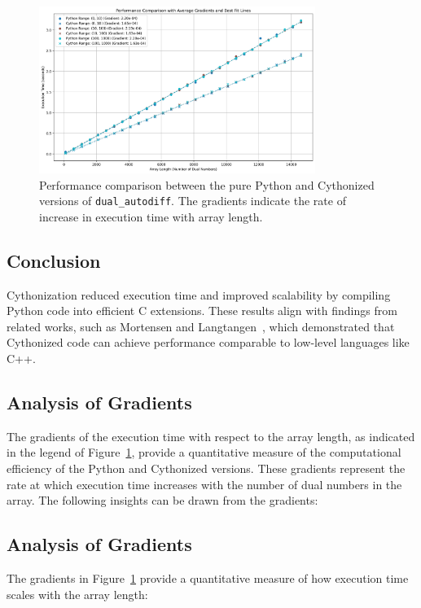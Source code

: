 \documentclass[a4paper,12pt]{article}
\begin{document}
\begin{figure}[h!]
    \centering
    \includegraphics[width=0.8\textwidth]{performance_comparison.png}
    \caption{Performance comparison between the pure Python and Cythonized versions of \texttt{dual\_autodiff}. The gradients indicate the rate of increase in execution time with array length.}
    \label{fig:performance_comparison}
\end{figure}

\subsection{Conclusion}
Cythonization reduced execution time and improved scalability by compiling Python code into efficient C extensions. These results align with findings from related works, such as Mortensen and Langtangen~\cite{mortensen2016cython}, which demonstrated that Cythonized code can achieve performance comparable to low-level languages like C++.




\subsection{Analysis of Gradients}
The gradients of the execution time with respect to the array length, as indicated in the legend of Figure~\ref{fig:performance_comparison}, provide a quantitative measure of the computational efficiency of the Python and Cythonized versions. These gradients represent the rate at which execution time increases with the number of dual numbers in the array. The following insights can be drawn from the gradients:

\subsection{Analysis of Gradients}
The gradients in Figure~\ref{fig:performance_comparison} provide a quantitative measure of how execution time scales with the array length:
\end{document}
